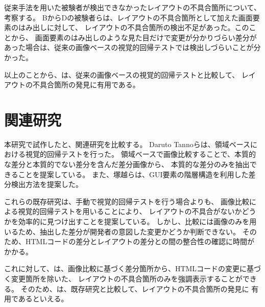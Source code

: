 従来手法を用いた被験者が検出できなかったレイアウトの不具合箇所について、考察する。
BからDの被験者らは、レイアウトの不具合箇所として加えた画面要素のはみ出しに対して、
レイアウトの不具合箇所の検出不足があった。このことから、
画面要素のはみ出しのような見た目だけで変更が分かりづらい差分があった場合は、従来の画像ベースの視覚的回帰テストでは検出しづらいことが分かった。

以上のことから、\toolName は、従来の画像ベースの視覚的回帰テストと比較して、
レイアウトの不具合箇所の発見に有用である。

\section{関連研究}\label{sec:relation_research}
本研究で試作した\toolName と、関連研究を比較する。
Daruto Tannoらは、領域ベースにおける視覚的回帰テストを行った\cite{RegionDetect}。
領域ベースで画像比較することで、本質的な差分と本質的でない差分を含んだ差分画像から、
本質的な差分のみを抽出できることを提案している。
また、塚越らは、GUI要素の階層構造を利用した差分検出方法を提案した\cite{GuiRetrExternal}。
\par
これらの既存研究は、手動で視覚的回帰テストを行う場合よりも、
画像比較による視覚的回帰テストを用いることにより、
レイアウトの不具合がないかどうかを効率的に見つけ出すことを提案している。
しかし、比較には画像のみを用いるため、抽出した差分が開発者の意図した変更かどうか判断できない。
そのため、HTMLコードの差分とレイアウトの差分との間の整合性の確認に時間がかかる。

これに対して、\toolName は、画像比較に基づく差分箇所から、HTMLコードの変更に基づく変更箇所を除いた、
レイアウトの不具合箇所のみを強調表示することができる。
そのため、\toolName は、既存研究と比較して、レイアウトの不具合箇所の発見に
有用であるといえる。

